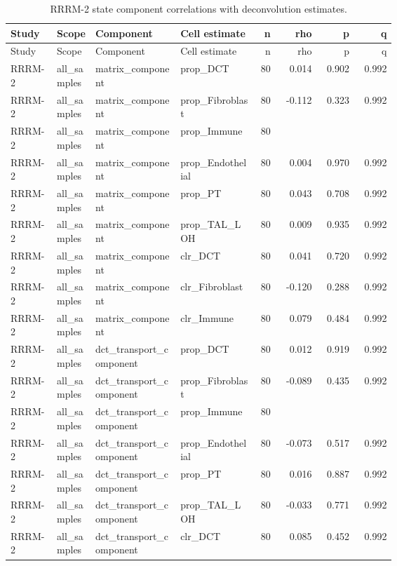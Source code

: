 \documentclass[11pt]{article}
\begin{document}
\begin{landscape}
\scriptsize
\setlength{\tabcolsep}{3pt}
\begin{longtable}{p{0.12\linewidth}p{0.10\linewidth}p{0.22\linewidth}p{0.20\linewidth}rrrr}
\caption{RRRM-2 state component correlations with deconvolution estimates.}\\
\toprule
Study & Scope & Component & Cell estimate & n & rho & p & q \\
\midrule
\endfirsthead
\toprule
Study & Scope & Component & Cell estimate & n & rho & p & q \\
\midrule
\endhead
RRRM-2 & all\_samples & matrix\_component & prop\_DCT & 80 & 0.014 & 0.902 & 0.992 \\
RRRM-2 & all\_samples & matrix\_component & prop\_Fibroblast & 80 & -0.112 & 0.323 & 0.992 \\
RRRM-2 & all\_samples & matrix\_component & prop\_Immune & 80 &  &  &  \\
RRRM-2 & all\_samples & matrix\_component & prop\_Endothelial & 80 & 0.004 & 0.970 & 0.992 \\
RRRM-2 & all\_samples & matrix\_component & prop\_PT & 80 & 0.043 & 0.708 & 0.992 \\
RRRM-2 & all\_samples & matrix\_component & prop\_TAL\_LOH & 80 & 0.009 & 0.935 & 0.992 \\
RRRM-2 & all\_samples & matrix\_component & clr\_DCT & 80 & 0.041 & 0.720 & 0.992 \\
RRRM-2 & all\_samples & matrix\_component & clr\_Fibroblast & 80 & -0.120 & 0.288 & 0.992 \\
RRRM-2 & all\_samples & matrix\_component & clr\_Immune & 80 & 0.079 & 0.484 & 0.992 \\
RRRM-2 & all\_samples & dct\_transport\_component & prop\_DCT & 80 & 0.012 & 0.919 & 0.992 \\
RRRM-2 & all\_samples & dct\_transport\_component & prop\_Fibroblast & 80 & -0.089 & 0.435 & 0.992 \\
RRRM-2 & all\_samples & dct\_transport\_component & prop\_Immune & 80 &  &  &  \\
RRRM-2 & all\_samples & dct\_transport\_component & prop\_Endothelial & 80 & -0.073 & 0.517 & 0.992 \\
RRRM-2 & all\_samples & dct\_transport\_component & prop\_PT & 80 & 0.016 & 0.887 & 0.992 \\
RRRM-2 & all\_samples & dct\_transport\_component & prop\_TAL\_LOH & 80 & -0.033 & 0.771 & 0.992 \\
RRRM-2 & all\_samples & dct\_transport\_component & clr\_DCT & 80 & 0.085 & 0.452 & 0.992 \\

\end{longtable}
\end{landscape}
\end{document}

